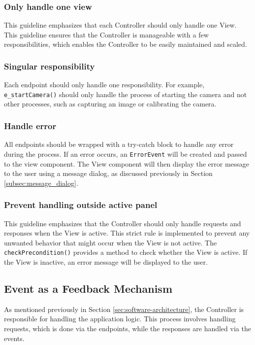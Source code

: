 \subsubsection{Only handle one view}
This guideline emphasizes that each Controller should only handle one View. This guideline ensures that the Controller is manageable with a few responsibilities, which enables the Controller to be easily maintained and scaled.

\subsubsection{Singular responsibility}
Each endpoint should only handle one responsibility. For example, \texttt{e\_startCamera()} should only handle the process of starting the camera and not other processes, such as capturing an image or calibrating the camera.

\subsubsection{Handle error}
All endpoints should be wrapped with a try-catch block to handle any error during the process. If an error occurs, an \texttt{ErrorEvent} will be created and passed to the view component. The View component will then display the error message to the user using a message dialog, as discussed previously in Section \ref{subsec:message_dialog}.

\subsubsection{Prevent handling outside active panel}
\label{subsec:prevent_handling_outside_active_panel}
This guideline emphasizes that the Controller should only handle requests and responses when the View is active. This strict rule is implemented to prevent any unwanted behavior that might occur when the View is not active. The \texttt{checkPrecondition()} provides a method to check whether the View is active. If the View is inactive, an error message will be displayed to the user.

\subsection{Event as a Feedback Mechanism}
\label{subsec:event_as_feedback_mechanism}

As mentioned previously in Section \ref{sec:software-architecture}, the Controller is responsible for handling the application logic. This process involves handling requests, which is done via the endpoints, while the responses are handled via the events.

